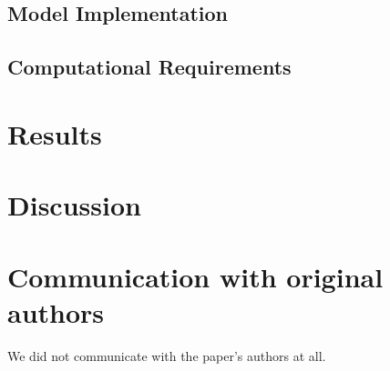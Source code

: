 \documentclass{article}
\begin{document}
    \subsection{Model Implementation}\label{subsec:model-implementation}
    

    \subsection{Computational Requirements}\label{subsec:computational-requirements}
    

    \section{Results}\label{sec:results}
    

    \section{Discussion}\label{sec:discussion}
    

    \section{Communication with original authors}
    We did not communicate with the paper's authors at all.

    
\end{document}
